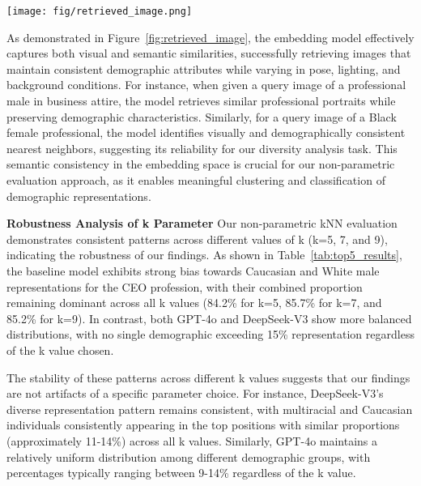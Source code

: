 \begin{figure*}[ht]
    \centering
    \texttt{[image: fig/retrieved\_image.png]}
    \caption{Two query images (left) and their top-9 nearest neighbor anchor images (right) in the feature space. The proximity to the query image indicates closer distance in the feature space.}
    \label{fig:retrieved_image}
\end{figure*}

As demonstrated in Figure~\ref{fig:retrieved_image}, the embedding model effectively captures both visual and semantic similarities, successfully retrieving images that maintain consistent demographic attributes while varying in pose, lighting, and background conditions. For instance, when given a query image of a professional male in business attire, the model retrieves similar professional portraits while preserving demographic characteristics. Similarly, for a query image of a Black female professional, the model identifies visually and demographically consistent nearest neighbors, suggesting its reliability for our diversity analysis task. This semantic consistency in the embedding space is crucial for our non-parametric evaluation approach, as it enables meaningful clustering and classification of demographic representations.

\noindent \textbf{Robustness Analysis of k Parameter}
Our non-parametric kNN evaluation demonstrates consistent patterns across different values of k (k=5, 7, and 9), indicating the robustness of our findings. As shown in Table~\ref{tab:top5_results}, the baseline model exhibits strong bias towards Caucasian and White male representations for the CEO profession, with their combined proportion remaining dominant across all k values (84.2\% for k=5, 85.7\% for k=7, and 85.2\% for k=9). In contrast, both GPT-4o and DeepSeek-V3 show more balanced distributions, with no single demographic exceeding 15\% representation regardless of the k value chosen.

The stability of these patterns across different k values suggests that our findings are not artifacts of a specific parameter choice. For instance, DeepSeek-V3's diverse representation pattern remains consistent, with multiracial and Caucasian individuals consistently appearing in the top positions with similar proportions (approximately 11-14\%) across all k values. Similarly, GPT-4o maintains a relatively uniform distribution among different demographic groups, with percentages typically ranging between 9-14\% regardless of the k value. 

